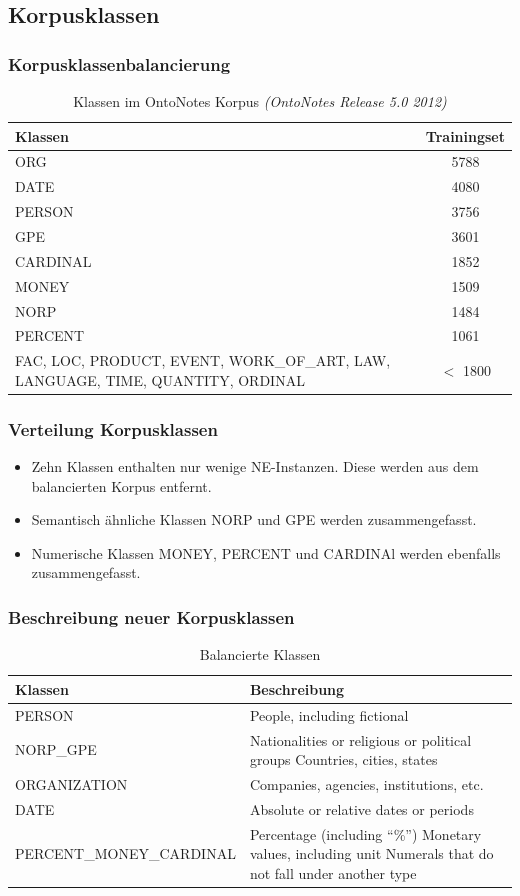 \documentclass{beamer}
\begin{document}
	\subsection{Korpusklassen}
		\begin{frame}
			\frametitle{Korpusklassenbalancierung}
				\begin{table}
				\caption{Klassen im OntoNotes Korpus \textit{(OntoNotes Release 5.0 2012)}}
				\begin{tabularx}{\textwidth}{Xc}
					\toprule
					Klassen  & Trainingset \\
					\midrule
					ORG  & 5788 \\
					DATE & 4080  \\
					PERSON & 3756 \\
					GPE & 3601 \\
					CARDINAL & 1852 \\
					MONEY & 1509  \\
					NORP & 1484 \\
					PERCENT & 1061  \\
					FAC, LOC, PRODUCT, EVENT, WORK\_OF\_ART, LAW, LANGUAGE, TIME, QUANTITY, ORDINAL & $<$ 1800 \\
					\bottomrule
				\end{tabularx}
				\label{tab:datasets}
			\end{table}
		\end{frame}
			\begin{frame}
				\frametitle{Verteilung Korpusklassen}
				\begin{itemize}
					\item Zehn Klassen enthalten nur wenige NE-Instanzen. Diese werden aus dem balancierten Korpus entfernt.
					\item Semantisch ähnliche Klassen NORP und GPE werden zusammengefasst.
					\item Numerische Klassen MONEY, PERCENT und CARDINAl werden ebenfalls zusammengefasst.
				\end{itemize}
			\end{frame}
	\begin{frame}
		\frametitle{Beschreibung neuer Korpusklassen}
		\begin{table}
			\caption{Balancierte Klassen}
			\begin{tabularx}{\textwidth}{lX}
				\toprule
				Klassen  & Beschreibung \\
				\midrule
				PERSON 	& People, including fictional \\
				NORP\_GPE &	Nationalities or religious or political groups
				Countries, cities, states\\
				ORGANIZATION &	Companies, agencies, institutions, etc.\\
				DATE &	Absolute or relative dates or periods\\
				PERCENT\_MONEY\_CARDINAL &	Percentage (including “\%”)
				Monetary values, including unit
				Numerals that do not fall under another type \\
				\bottomrule
			\end{tabularx}
			\label{tab:datasets}
		\end{table}
	\end{frame}
\end{document}
